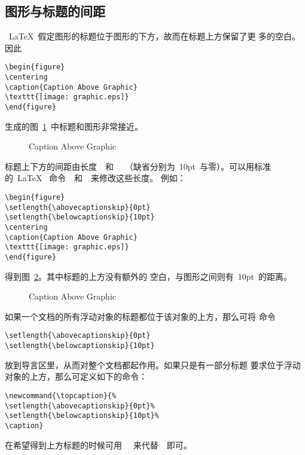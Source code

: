 \subsection{图形与标题的间距}\label{ssec:capspace}

~\LaTeX{}~假定图形的标题位于图形的下方，故而在标题上方保留了更
多的空白。因此
\begin{Verbatim}[xleftmargin=1cm]
\begin{figure} 
\centering 
\caption{Caption Above Graphic} 
\texttt{[image: graphic.eps]} 
\end{figure}
\end{Verbatim}
生成的图~\ref{fig:verynearcap}~中标题和图形非常接近。

\begin{figure} 
	\centering 
	\caption{Caption Above Graphic}\label{fig:verynearcap}
	\resizebox{2in}{!}{\usebox{\graphic}}
\end{figure}

标题上下方的间距由长度~~和
~~（缺省分别为~10pt~与零）。可以用标准的~\LaTeX{}~
命令~~和~~来修改这些长度。
例如：
\begin{Verbatim}[xleftmargin=1cm]
\begin{figure} 
\setlength{\abovecaptionskip}{0pt} 
\setlength{\belowcaptionskip}{10pt} 
\centering 
\caption{Caption Above Graphic} 
\texttt{[image: graphic.eps]} 
\end{figure}
\end{Verbatim}
得到图~\ref{fig:normalabovefig}。其中标题的上方没有额外的
空白，与图形之间则有~10pt~的距离。

\begin{figure}
	\setlength{\abovecaptionskip}{0pt}
	\setlength{\belowcaptionskip}{10pt}
	\centering
	\caption{Caption Above Graphic}\label{fig:normalabovefig}
	\resizebox{2in}{!}{\usebox{\graphic}}
\end{figure}

如果一个文档的所有浮动对象的标题都位于该对象的上方，那么可将
命令
\begin{Verbatim}[xleftmargin=1cm]
\setlength{\abovecaptionskip}{0pt}
\setlength{\belowcaptionskip}{10pt}
\end{Verbatim}
放到导言区里，从而对整个文档都起作用。如果只是有一部分标题
要求位于浮动对象的上方，那么可定义如下的命令：
\begin{Verbatim}[xleftmargin=1cm]
\newcommand{\topcaption}{% 
\setlength{\abovecaptionskip}{0pt}% 
\setlength{\belowcaptionskip}{10pt}% 
\caption}
\end{Verbatim}
在希望得到上方标题的时候可用~~
来代替~~即可。

